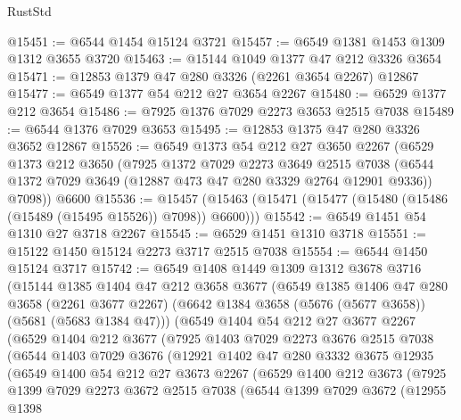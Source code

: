 \begin{lexlean}{RustStd}
\begin{coremodule}
@15451 := @6544 @1454 @15124 @3721
@15457 := @6549 @1381 @1453 @1309 @1312 @3655 @3720
@15463 := @15144 @1049 @1377 @47 @212 @3326 @3654
@15471 := @12853 @1379 @47 @280 @3326 (@2261 @3654 @2267) @12867
@15477 := @6549 @1377 @54 @212 @27 @3654 @2267
@15480 := @6529 @1377 @212 @3654
@15486 := @7925 @1376 @7029 @2273 @3653 @2515 @7038
@15489 := @6544 @1376 @7029 @3653
@15495 := @12853 @1375 @47 @280 @3326 @3652 @12867
@15526 := @6549
    @1373
    @54
    @212
    @27
    @3650
    @2267
    (@6529
      @1373
      @212
      @3650
      (@7925
        @1372
        @7029
        @2273
        @3649
        @2515
        @7038
        (@6544 @1372 @7029 @3649 (@12887 @473 @47 @280 @3329 @2764 @12901 @9336))
        @7098))
    @6600
@15536 := @15457 (@15463 (@15471 (@15477 (@15480 (@15486 (@15489 (@15495 @15526)) @7098)) @6600)))
@15542 := @6549 @1451 @54 @1310 @27 @3718 @2267
@15545 := @6529 @1451 @1310 @3718
@15551 := @15122 @1450 @15124 @2273 @3717 @2515 @7038
@15554 := @6544 @1450 @15124 @3717
@15742 := @6549
    @1408
    @1449
    @1309
    @1312
    @3678
    @3716
    (@15144
      @1385
      @1404
      @47
      @212
      @3658
      @3677
      (@6549
        @1385
        @1406
        @47
        @280
        @3658
        (@2261 @3677 @2267)
        (@6642 @1384 @3658 (@5676 (@5677 @3658)) (@5681 (@5683 @1384 @47)))
        (@6549
          @1404
          @54
          @212
          @27
          @3677
          @2267
          (@6529
            @1404
            @212
            @3677
            (@7925
              @1403
              @7029
              @2273
              @3676
              @2515
              @7038
              (@6544
                @1403
                @7029
                @3676
                (@12921
                  @1402
                  @47
                  @280
                  @3332
                  @3675
                  @12935
                  (@6549
                    @1400
                    @54
                    @212
                    @27
                    @3673
                    @2267
                    (@6529
                      @1400
                      @212
                      @3673
                      (@7925
                        @1399
                        @7029
                        @2273
                        @3672
                        @2515
                        @7038
                        (@6544
                          @1399
                          @7029
                          @3672
                          (@12955
                            @1398

\end{coremodule}
\end{lexlean}

